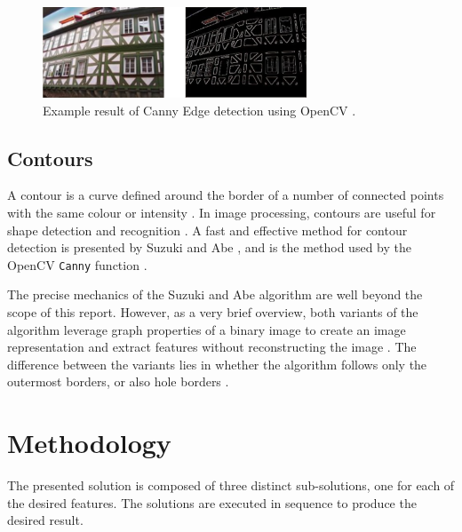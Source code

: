 \begin{figure}[ht]
  \centering
  \includegraphics[width=0.7\textwidth]{images/canny_edges.png}
  \caption{Example result of Canny Edge detection using OpenCV \cite{opencv_canny}.}
  \label{fig:canny}
\end{figure}

\subsection{Contours}

A contour is a curve defined around the border of a number of connected points with the same colour or intensity \cite{opencv_contour}. In image processing, contours are useful for shape detection and recognition \cite{opencv_contour}. A fast and effective method for contour detection is presented by Suzuki and Abe \cite{suzuki_1985}, and is the method used by the OpenCV \texttt{Canny} function \cite{opencv_bib}.

The precise mechanics of the Suzuki and Abe \cite{suzuki_1985} algorithm are well beyond the scope of this report. However, as a very brief overview, both variants of the algorithm leverage graph properties of a binary image to create an image representation and extract features without reconstructing the image \cite{suzuki_1985}. The difference between the variants lies in whether the algorithm follows only the outermost borders, or also hole borders \cite{suzuki_1985}.

\section{Methodology}

The presented solution is composed of three distinct sub-solutions, one for each of the desired features. The solutions are executed in sequence to produce the desired result.

